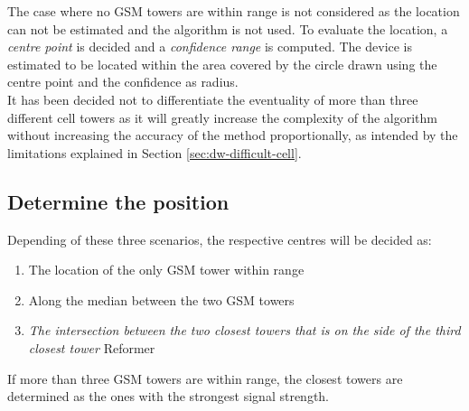 The case where no GSM towers are within range is not considered as the location can not be estimated and the algorithm is not used.
To evaluate the location, a \emph{centre point} is decided and a \emph{confidence range} is computed.
The device is estimated to be located within the area covered by the circle drawn using the centre point and the confidence as radius.\\

It has been decided not to differentiate the eventuality of more than three different cell towers as it will greatly increase the complexity of the algorithm without increasing the accuracy of the method proportionally, as intended by the limitations explained in Section \ref{sec:dw-difficult-cell}.

\subsection{Determine the position}

Depending of these three scenarios, the respective centres will be decided as:

\begin{enumerate}
\item The location of the only GSM tower within range
\item Along the median between the two GSM towers
\item \emph{The intersection between the two closest towers that is on the side of the third closest tower} Reformer
\end{enumerate}

If more than three GSM towers are within range, the closest towers are determined as the ones with the strongest signal strength.\\

